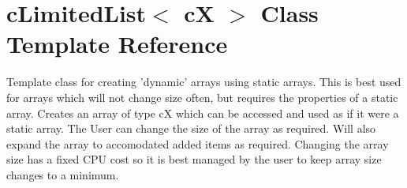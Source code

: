 \hypertarget{classc_limited_list}{
\section{cLimitedList$<$ cX $>$ Class Template Reference}
\label{classc_limited_list}
}


Template class for creating 'dynamic' arrays using static arrays. This is best used for arrays which will not change size often, but requires the properties of a static array. Creates an array of type cX which can be accessed and used as if it were a static array. The User can change the size of the array as required. Will also expand the array to accomodated added items as required. Changing the array size has a fixed CPU cost so it is best managed by the user to keep array size changes to a minimum.  


